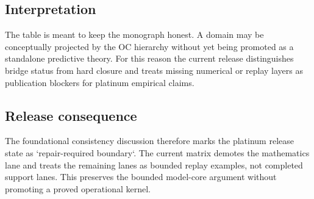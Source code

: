 \subsection{Interpretation}
The table is meant to keep the monograph honest. A domain may be conceptually projected by the OC hierarchy without yet being promoted as a standalone predictive theory.
For this reason the current release distinguishes bridge status from hard closure and treats missing numerical or replay layers as publication blockers for platinum empirical claims.

\subsection{Release consequence}
The foundational consistency discussion therefore marks the platinum release state as `repair-required boundary`.
The current matrix demotes the mathematics lane and treats the remaining lanes as bounded replay examples, not completed support lanes.
This preserves the bounded model-core argument without promoting a proved operational kernel.

